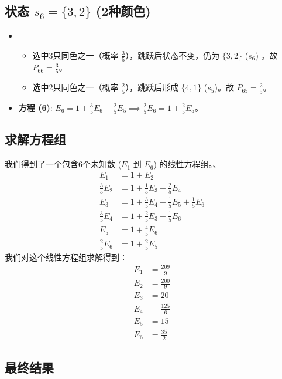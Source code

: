 \documentclass[UTF8]{ctexart}
\begin{document}
\subsection*{状态 $s_6 = \{3, 2\}$ (2种颜色)}
\begin{itemize}
    \item 
        \begin{itemize}
            \item 选中3只同色之一（概率 $\frac{3}{5}$），跳跃后状态不变，仍为 $\{3,2\}$ ($s_6$) 。故 $P_{66} = \frac{3}{5}$。
            \item 选中2只同色之一（概率 $\frac{2}{5}$），跳跃后形成 $\{4,1\}$ ($s_5$)。故 $P_{65} = \frac{2}{5}$。
        \end{itemize}
    \item \textbf{方程 (6)}: $E_6 = 1 + \frac{3}{5}E_6 + \frac{2}{5}E_5 \implies \frac{2}{5}E_6 = 1 + \frac{2}{5}E_5$。
\end{itemize}

\subsection*{求解方程组}

我们得到了一个包含6个未知数 ($E_1$ 到 $E_6$) 的线性方程组。、
$$
\begin{aligned}
E_1 &= 1 + E_2 \\
\frac{3}{5}E_2 &= 1 + \frac{1}{5}E_3 + \frac{2}{5}E_4 \\
E_3 &= 1 + \frac{3}{5}E_4 + \frac{1}{5}E_5 + \frac{1}{5}E_6 \\
\frac{3}{5}E_4 &= 1 + \frac{2}{5}E_3 + \frac{1}{5}E_6 \\
E_5 &= 1 + \frac{4}{5}E_6 \\
\frac{2}{5} E_6 &= 1 + \frac{2}{5}E_5
\end{aligned}
$$
我们对这个线性方程组求解得到：
$$
\begin{align*}
    E_1 &= \frac{209}{9} \\
    E_2 &= \frac{200}{9} \\
    E_3 &= 20 \\
    E_4 &= \frac{125}{6} \\
    E_5 &= 15 \\
    E_6 &= \frac{35}{2}
    \end{align*}
$$

\subsection*{最终结果}
\end{document}
